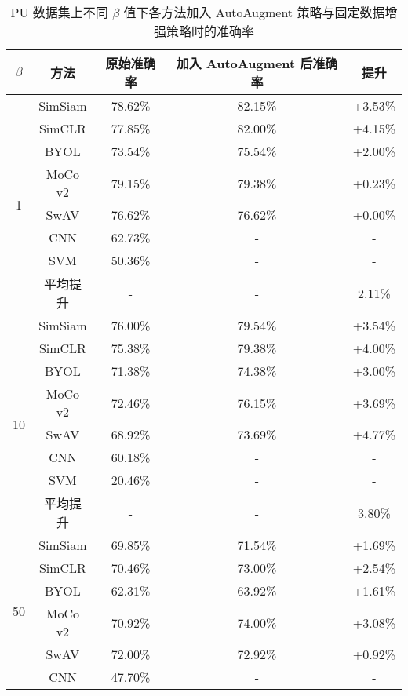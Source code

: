 \documentclass[master]{thesis-uestc}
\begin{document}
\begin{table}[htbp!]
    \caption{PU 数据集上不同 $\beta$ 值下各方法加入 AutoAugment 策略与固定数据增强策略时的准确率}
    \centering
    \renewcommand\arraystretch{1.2}
    \begin{tabular}{ccccc}
        \toprule
        $\beta$ & 方法 & 原始准确率 & 加入 AutoAugment 后准确率 & 提升 \\
        \midrule
        \multirow{8}{*}{1} 
            & SimSiam & 78.62\% & 82.15\% & +3.53\% \\
            & SimCLR  & 77.85\% & 82.00\% & +4.15\% \\
            & BYOL    & 73.54\% & 75.54\% & +2.00\% \\
            & MoCo v2 & 79.15\% & 79.38\% & +0.23\% \\
            & SwAV    & 76.62\% & 76.62\% & +0.00\% \\
            & CNN     & 62.73\% & -       & -       \\
            & SVM     & 50.36\% & -       & -       \\
            & 平均提升 & - & - & 2.11\% \\
        \midrule
        \multirow{8}{*}{10} 
            & SimSiam & 76.00\% & 79.54\% & +3.54\% \\
            & SimCLR  & 75.38\% & 79.38\% & +4.00\% \\
            & BYOL    & 71.38\% & 74.38\% & +3.00\% \\
            & MoCo v2 & 72.46\% & 76.15\% & +3.69\% \\
            & SwAV    & 68.92\% & 73.69\% & +4.77\% \\
            & CNN     & 60.18\% & -       & -       \\
            & SVM     & 20.46\% & -       & -       \\
            & 平均提升 & - & - & 3.80\% \\
        \midrule
        \multirow{8}{*}{50} 
            & SimSiam & 69.85\% & 71.54\% & +1.69\% \\
            & SimCLR  & 70.46\% & 73.00\% & +2.54\% \\
            & BYOL    & 62.31\% & 63.92\% & +1.61\% \\
            & MoCo v2 & 70.92\% & 74.00\% & +3.08\% \\
            & SwAV    & 72.00\% & 72.92\% & +0.92\% \\
            & CNN     & 47.70\% & -       & -       \\

\end{tabular}
\end{table}
\end{document}
